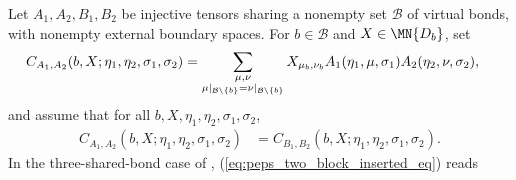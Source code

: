 \begin{lemma}%
    \label{thm:peps_twoInjectiveTensorInsertionComparison}
    \leanok
    Let $A_1,A_2,B_1,B_2$ be injective tensors sharing a nonempty set
    $\mathcal B$ of virtual bonds, with nonempty external boundary spaces. For
    $b\in\mathcal B$ and $X\in\MN{D_b}$, set
    \begin{align}
        C_{A_1,A_2}(b,X;\eta_1,\eta_2,\sigma_1,\sigma_2)
         & =
        \sum_{\substack{\mu,\nu \\
                \mu|_{\mathcal B\setminus\{b\}}
                =\nu|_{\mathcal B\setminus\{b\}}}}
        X_{\mu_b,\nu_b}
        A_1(\eta_1,\mu,\sigma_1)A_2(\eta_2,\nu,\sigma_2),
        \notag
    \end{align}
    and assume that for all $b,X,\eta_1,\eta_2,\sigma_1,\sigma_2$,
    \begin{align}
        C_{A_1,A_2}(b,X;\eta_1,\eta_2,\sigma_1,\sigma_2)
         & =
        C_{B_1,B_2}(b,X;\eta_1,\eta_2,\sigma_1,\sigma_2).
        \label{eq:peps_two_block_inserted_eq}
    \end{align}
    In the three-shared-bond case of \cite[Section~3]{Molnar2018NormalPEPS},
    (\ref{eq:peps_two_block_inserted_eq}) reads
    \begin{center}
        \tenkzkernel
        \begin{tenkz}[rows={wire}, cols=4, bonds=none]

\end{tenkz}
\end{center}
\end{lemma}
